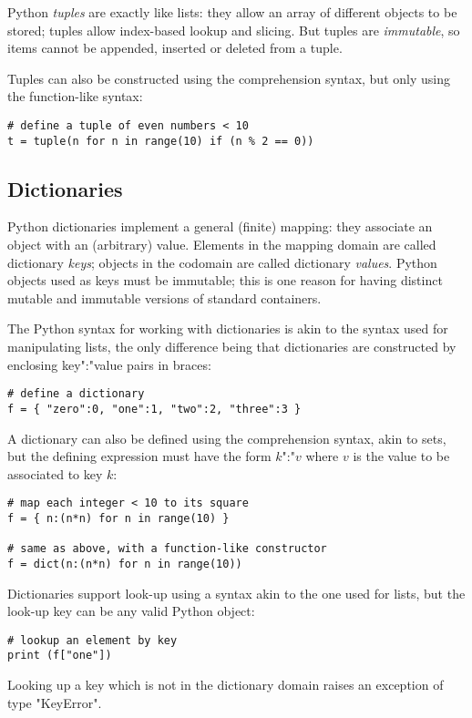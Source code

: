 {Python \emph{tuples} are exactly like lists: they allow an array of
different objects to be stored; tuples allow index-based lookup and
slicing. But tuples are \emph{immutable}, so items cannot be
appended, inserted or deleted from a tuple.

Tuples can also be constructed using the comprehension syntax, but
only using the function-like syntax:
\begin{lstlisting}
# define a tuple of even numbers < 10
t = tuple(n for n in range(10) if (n % 2 == 0))
\end{lstlisting}


\subsection{Dictionaries}
\label{sec:dicts}

Python dictionaries implement a general (finite) mapping: they
associate an object with an (arbitrary) value.  Elements in the
mapping domain are called dictionary \emph{keys}; objects in the
codomain are called dictionary \emph{values}.  Python objects used as
keys must be immutable; this is one reason for having distinct mutable
and immutable versions of standard containers.

The Python syntax for working with dictionaries is akin to the syntax used
for manipulating lists, the only difference being that dictionaries
are constructed by enclosing key":"value pairs in braces:
\begin{lstlisting}
# define a dictionary
f = { "zero":0, "one":1, "two":2, "three":3 }
\end{lstlisting}
A dictionary can also be defined using the comprehension syntax,
akin to sets, but the defining expression must have the form
$k$":"$v$ where $v$ is the value to be associated to key $k$:
\begin{lstlisting}
# map each integer < 10 to its square
f = { n:(n*n) for n in range(10) }

# same as above, with a function-like constructor
f = dict(n:(n*n) for n in range(10))
\end{lstlisting}

Dictionaries support look-up using a syntax akin to the one used for
lists, but the look-up key can be any valid Python object:
\begin{lstlisting}
# lookup an element by key
print (f["one"])
\end{lstlisting}
Looking up a key which is not in the dictionary domain raises an
exception of type "KeyError".

}
